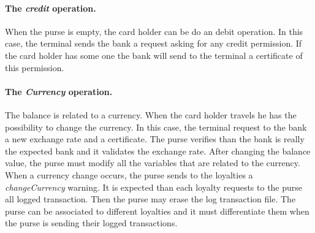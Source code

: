 \paragraph{The \textit{credit} operation.} When the purse is empty, the 
card holder can be do an debit operation. In this case, the terminal
sends the bank a request asking for any credit permission. If the card 
holder has some one the bank will send to the terminal a certificate of 
this permission. 



\paragraph{The \textit{Currency} operation.} The balance is related to a
currency. When the card holder travels he has the possibility to
change the currency. In this case, the terminal request to the bank a
new exchange rate and a certificate. The purse verifies than the bank is 
really the expected bank and it validates the exchange rate. After
changing the balance value, the purse must modify all the variables
that are related to the currency. \\

When a currency change occurs, the purse sends to the loyalties a
\textit{changeCurrency} warning. It is expected than each loyalty
requests to the purse all logged transaction.  Then the purse may erase 
the log transaction file. The purse can be associated to different
loyalties and it must differentiate them when the purse is sending
their logged transactions. \\
